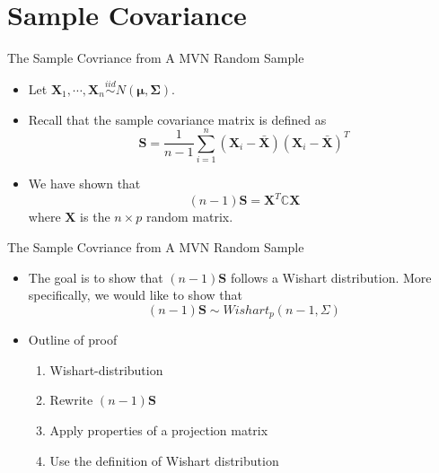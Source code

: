 \documentclass[
  ignorenonframetext,
]{beamer}
\providecommand{\tightlist}{%
  \setlength{\itemsep}{0pt}\setlength{\parskip}{0pt}}
\begin{document}
\hypertarget{sample-covariance}{%
\section{Sample Covariance}\label{sample-covariance}}

\begin{frame}{The Sample Covriance from A MVN Random Sample}
\protect\hypertarget{the-sample-covriance-from-a-mvn-random-sample}{}
\begin{itemize}
\tightlist
\item
  Let
  \(\mathbf X_1, \cdots,\mathbf X_n \overset{iid} \sim N(\boldsymbol \mu, \boldsymbol \Sigma)\).
\item
  Recall that the sample covariance matrix is defined as
  \[\mathbf S =\frac{1}{n-1} \sum_{i=1}^n (\mathbf X_i - \bar{\mathbf X})(\mathbf X_i - \bar{\mathbf X})^T\]
\item
  We have shown that
  \[(n-1)\mathbf S = \mathbf X ^T \mathbb C \mathbf X\] where
  \(\mathbf X\) is the \(n\times p\) random matrix.
\end{itemize}
\end{frame}

\begin{frame}{The Sample Covriance from A MVN Random Sample}
\protect\hypertarget{the-sample-covriance-from-a-mvn-random-sample-1}{}
\begin{itemize}
\tightlist
\item
  The goal is to show that \((n-1)\mathbf S\) follows a Wishart
  distribution. More specifically, we would like to show that
  \[(n-1)\mathbf S \sim Wishart_p(n-1, \Sigma)\]
\item
  Outline of proof

  \begin{enumerate}
  \tightlist
  \item
    Wishart-distribution
  \item
    Rewrite \((n-1)\mathbf S\)
  \item
    Apply properties of a projection matrix
  \item
    Use the definition of Wishart distribution
  \end{enumerate}
\end{itemize}
\end{frame}
\end{document}
